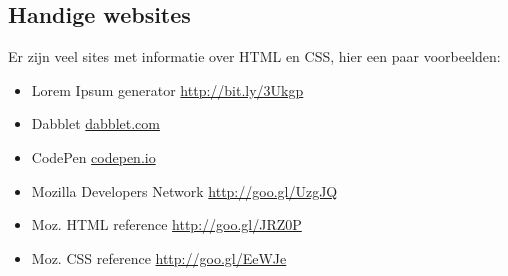 \documentclass[8pt,pagesize,footinclude=false,headinclude=false]{scrartcl}
\begin{document}
\begin{multicols*}{4}
\subsection*{Handige websites}
Er zijn veel sites met informatie over HTML en CSS, hier een paar voorbeelden:
\begin{itemize}
	\item Lorem Ipsum generator \url{http://bit.ly/3Ukgp}
	\item Dabblet \url{dabblet.com}
	\item CodePen \url{codepen.io}
	\item Mozilla Developers Network \url{http://goo.gl/UzgJQ}
	\item Moz. HTML reference \url{http://goo.gl/JRZ0P}
	\item Moz. CSS reference \url{http://goo.gl/EeWJe}
\end{itemize}

\end{multicols*}
\end{document}
